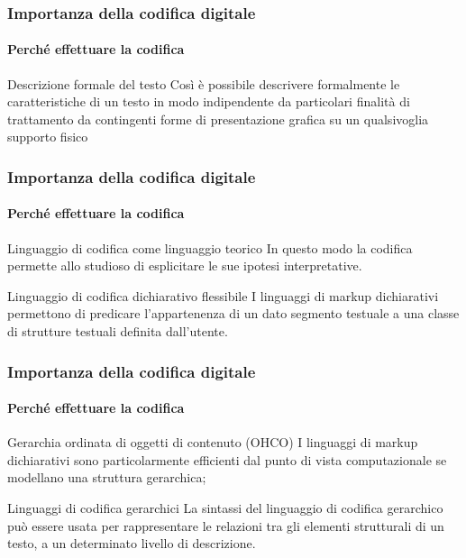 \begin{frame}
	\frametitle{Importanza della codifica digitale}
	\framesubtitle{Perché effettuare la codifica}
	\addtocounter{nframe}{1}

	\begin{block}{Descrizione formale del testo}
		Così è possibile descrivere formalmente le caratteristiche di un testo in modo indipendente da particolari finalità di trattamento da contingenti forme di presentazione grafica su un qualsivoglia supporto fisico
	\end{block}

\end{frame}


\begin{frame}
	\frametitle{Importanza della codifica digitale}
	\framesubtitle{Perché effettuare la codifica}
	\addtocounter{nframe}{1}

	\begin{block}{Linguaggio di codifica come linguaggio teorico}
		In questo modo la codifica permette allo studioso di esplicitare le sue ipotesi interpretative.
	\end{block}

	\begin{block}{Linguaggio di codifica dichiarativo flessibile}
		I linguaggi di markup dichiarativi permettono di predicare l’appartenenza di un dato segmento testuale a una classe di strutture testuali definita dall’utente.
	\end{block}

\end{frame}

\begin{frame}
	\frametitle{Importanza della codifica digitale}
	\framesubtitle{Perché effettuare la codifica}
	\addtocounter{nframe}{1}

	\begin{block}{Gerarchia ordinata di oggetti di contenuto (OHCO)}
		I linguaggi di markup dichiarativi sono particolarmente efficienti dal punto di vista computazionale se modellano una struttura gerarchica; 
	\end{block}

	\begin{block}{Linguaggi di codifica gerarchici}
		La sintassi del linguaggio di codifica gerarchico può essere usata per rappresentare le relazioni tra gli elementi strutturali di un testo, a un determinato livello di descrizione.
	\end{block}

\end{frame}

